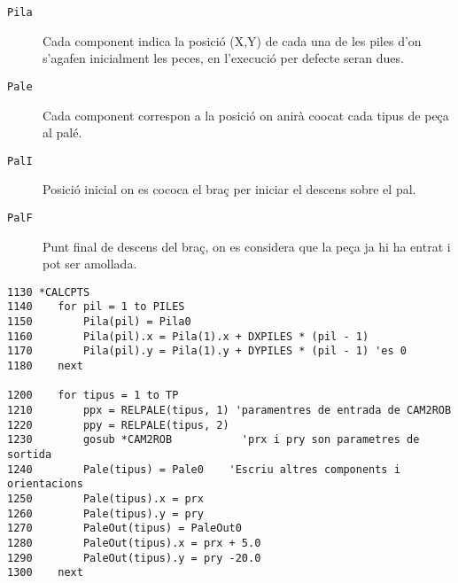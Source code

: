 \begin{description}
 \item [\texttt{Pila}] Cada component indica la posició (X,Y) de cada una de
les piles d'on s'agafen
inicialment les peces, en l'execució per defecte seran dues.
 \item [\texttt{Pale}] Cada component correspon a la posició on anirà
co\lgem ocat cada tipus de peça al palé.
 \item [\texttt{PalI}] Posició inicial on es co\lgem coca el braç per iniciar
el descens sobre el pal.
 \item [\texttt{PalF}] Punt final de descens del braç, on es considera que la
peça ja hi ha entrat i pot ser amollada.
\end{description}

\label{casosrot}
\begin{verbatim}
1130 *CALCPTS
1140    for pil = 1 to PILES
1150        Pila(pil) = Pila0
1160        Pila(pil).x = Pila(1).x + DXPILES * (pil - 1)
1170        Pila(pil).y = Pila(1).y + DYPILES * (pil - 1) 'es 0
1180    next

1200    for tipus = 1 to TP
1210        ppx = RELPALE(tipus, 1) 'paramentres de entrada de CAM2ROB
1220        ppy = RELPALE(tipus, 2)
1230        gosub *CAM2ROB           'prx i pry son parametres de sortida
1240        Pale(tipus) = Pale0    'Escriu altres components i orientacions
1250        Pale(tipus).x = prx
1260        Pale(tipus).y = pry
1270        PaleOut(tipus) = PaleOut0
1280        PaleOut(tipus).x = prx + 5.0
1290        PaleOut(tipus).y = pry -20.0
1300    next


\end{verbatim}
